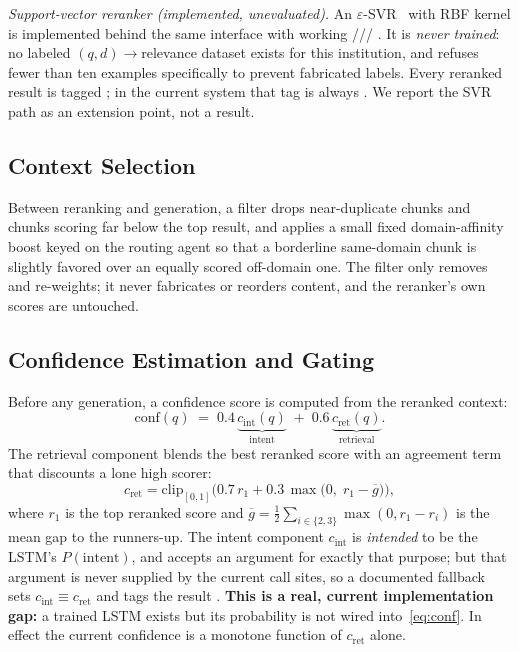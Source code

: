 \emph{Support-vector reranker (implemented, unevaluated).} An
$\varepsilon$-SVR~\cite{smola2004svr} with RBF kernel is implemented behind
the same interface with working ///
. It is \emph{never trained}: no labeled $(q,d)\to$relevance
dataset exists for this institution, and  refuses fewer than ten
examples specifically to prevent fabricated labels. Every reranked result
is tagged ; in the current system that tag is always
. We report the SVR path as an extension point,
not a result.

\subsection{Context Selection}
Between reranking and generation, a filter drops near-duplicate chunks and
chunks scoring far below the top result, and applies a small fixed
domain-affinity boost keyed on the routing agent so that a borderline
same-domain chunk is slightly favored over an equally scored off-domain
one. The filter only removes and re-weights; it never fabricates or
reorders content, and the reranker's own scores are untouched.

\subsection{Confidence Estimation and Gating}

Before any generation, a confidence score is computed from the reranked
context:
\begin{equation}
\mathrm{conf}(q) \;=\; 0.4\,\underbrace{c_{\mathrm{int}}(q)}_{\text{intent}}
\;+\; 0.6\,\underbrace{c_{\mathrm{ret}}(q)}_{\text{retrieval}}.
\label{eq:conf}
\end{equation}
The retrieval component blends the best reranked score with an agreement
term that discounts a lone high scorer:
\begin{equation}
c_{\mathrm{ret}} = \mathrm{clip}_{[0,1]}\!\Big(
0.7\,r_1 + 0.3\,\max\!\big(0,\; r_1 - \overline{g}\big)\Big),
\label{eq:cret}
\end{equation}
where $r_1$ is the top reranked score and
$\overline{g} = \frac{1}{2}\sum_{i\in\{2,3\}}\max(0, r_1 - r_i)$ is the
mean gap to the runners-up. The intent component $c_{\mathrm{int}}$ is
\emph{intended} to be the LSTM's $P(\text{intent})$, and
 accepts an  argument
for exactly that purpose; but that argument is never supplied by the
current call sites, so a documented fallback sets
$c_{\mathrm{int}} \equiv c_{\mathrm{ret}}$ and tags the result
. \textbf{This is a real,
current implementation gap:} a trained LSTM exists but its probability is
not wired into~\eqref{eq:conf}. In effect the current confidence is a
monotone function of $c_{\mathrm{ret}}$ alone.

